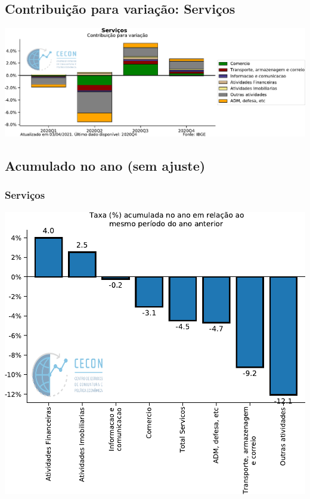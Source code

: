 \documentclass{SelfArx}
\begin{document}
\subsection*{Contribuição para variação: Serviços}
\label{sec:org2e90a28}

\begin{center}
\includegraphics[width=.9\linewidth]{./figs/PIB/Contrib_Servicos.pdf}
\end{center}

\subsection*{Acumulado no ano (sem ajuste)}
\label{sec:org816883d}

\subsubsection*{Serviços}
\label{sec:orgf2ffb8e}

\begin{center}
\includegraphics[width=.9\linewidth]{./figs/PIB/Servicos_Acum.pdf}
\end{center}
\end{document}

